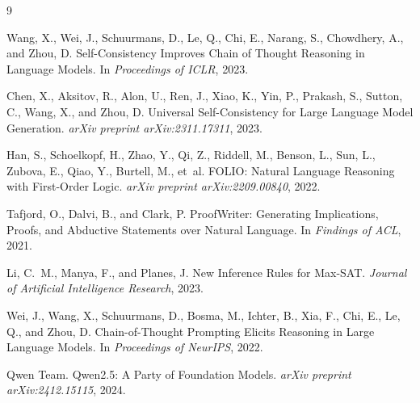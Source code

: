 \documentclass[11pt]{article}
\begin{document}

\begin{thebibliography}{9}

Wang, X., Wei, J., Schuurmans, D., Le, Q., Chi, E., Narang, S., Chowdhery, A., and Zhou, D.
\newblock Self-Consistency Improves Chain of Thought Reasoning in Language Models.
\newblock In \emph{Proceedings of ICLR}, 2023.

Chen, X., Aksitov, R., Alon, U., Ren, J., Xiao, K., Yin, P., Prakash, S., Sutton, C., Wang, X., and Zhou, D.
\newblock Universal Self-Consistency for Large Language Model Generation.
\newblock \emph{arXiv preprint arXiv:2311.17311}, 2023.

Han, S., Schoelkopf, H., Zhao, Y., Qi, Z., Riddell, M., Benson, L., Sun, L., Zubova, E., Qiao, Y., Burtell, M., et~al.
\newblock FOLIO: Natural Language Reasoning with First-Order Logic.
\newblock \emph{arXiv preprint arXiv:2209.00840}, 2022.

Tafjord, O., Dalvi, B., and Clark, P.
\newblock ProofWriter: Generating Implications, Proofs, and Abductive Statements over Natural Language.
\newblock In \emph{Findings of ACL}, 2021.

Li, C.~M., Manya, F., and Planes, J.
\newblock New Inference Rules for Max-SAT.
\newblock \emph{Journal of Artificial Intelligence Research}, 2023.

Wei, J., Wang, X., Schuurmans, D., Bosma, M., Ichter, B., Xia, F., Chi, E., Le, Q., and Zhou, D.
\newblock Chain-of-Thought Prompting Elicits Reasoning in Large Language Models.
\newblock In \emph{Proceedings of NeurIPS}, 2022.

Qwen Team.
\newblock Qwen2.5: A Party of Foundation Models.
\newblock \emph{arXiv preprint arXiv:2412.15115}, 2024.

\end{thebibliography}
\end{document}
